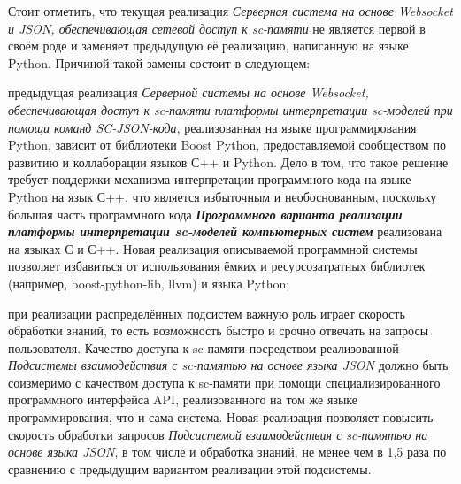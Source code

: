 \begin{scnitemize}
Стоит отметить, что текущая реализация \textit{Серверная система на основе Websocket и JSON, обеспечивающая сетевой доступ
к sc-памяти} не является первой в своём роде и заменяет предыдущую её реализацию, написанную на языке Python. Причиной
такой замены состоит в следующем:
\begin{scnitemize}
    \item предыдущая реализация \textit{Серверной системы на основе Websocket, обеспечивающая доступ к sc-памяти
    платформы интерпретации sc-моделей при помощи команд SC-JSON-кода}, реализованная на языке программирования Python,
    зависит от библиотеки Boost Python, предоставляемой сообществом по развитию и коллаборации языков С++ и Python.
    Дело в том, что такое решение требует поддержки механизма интерпретации программного кода на языке Python на язык С++,
    что является избыточным и необоснованным, поскольку большая часть программного кода \textit{\textbf{Программного
    варианта реализации платформы интерпретации sc-моделей компьютерных систем}} реализована на языках С и С++. Новая
    реализация описываемой программной системы позволяет избавиться от использования ёмких и ресурсозатратных библиотек
    (например, boost-python-lib, llvm) и языка Python;
    \item при реализации распределённых подсистем важную роль играет скорость обработки знаний, то есть возможность
    быстро и срочно отвечать на запросы пользователя. Качество доступа к sc-памяти посредством реализованной
    \textit{Подсистемы взаимодействия с sc-памятью на основе языка JSON} должно быть соизмеримо с качеством доступа
    к sc-памяти при помощи специализированного программного интерфейса API, реализованного на том же языке
    программирования, что и сама система. Новая реализация позволяет повысить скорость обработки запросов
    \textit{Подсистемой взаимодействия с sc-памятью на основе языка JSON}, в том числе и обработка знаний, не менее
    чем в 1,5 раза по сравнению с предыдущим вариантом реализации этой подсистемы.
\end{scnitemize}


\end{scnitemize}
